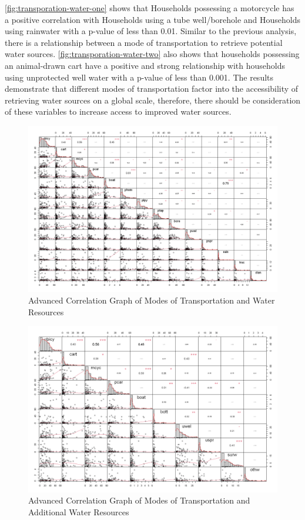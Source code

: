 \documentclass[10pt,twoside]{article}
\numberwithin{equation}{section}
\newcommand{\?}{\stackrel{?}{=}}
\begin{document}
\autoref{fig:transporation-water-one} shows that Households possessing a motorcycle has a positive correlation with Households using a tube well/borehole and Households using rainwater with a p-value of less than 0.01. Similar to the previous analysis, there is a relationship between a mode of transportation to retrieve potential water sources. \autoref{fig:transporation-water-two} also shows that households possessing an animal-drawn cart have a positive and strong relationship with households using unprotected well water with a p-value of less than 0.001. The results demonstrate that different modes of transportation factor into the accessibility of retrieving water sources on a global scale, therefore, there should be consideration of these variables to increase access to improved water sources. 
\begin{figure}[h!]
  \centering
  \includegraphics[width=.7\textwidth]{transportation-water-1}
  \caption{Advanced Correlation Graph of Modes of Transportation and Water Resources}
  \label{fig:transporation-water-one}
\end{figure}

\begin{figure}[h!]
  \centering
  \includegraphics[width=.7\textwidth]{transportation-water-2}
  \caption{Advanced Correlation Graph of Modes of Transportation and Additional Water Resources}
  \label{fig:transporation-water-two}
\end{figure}
\end{document}
